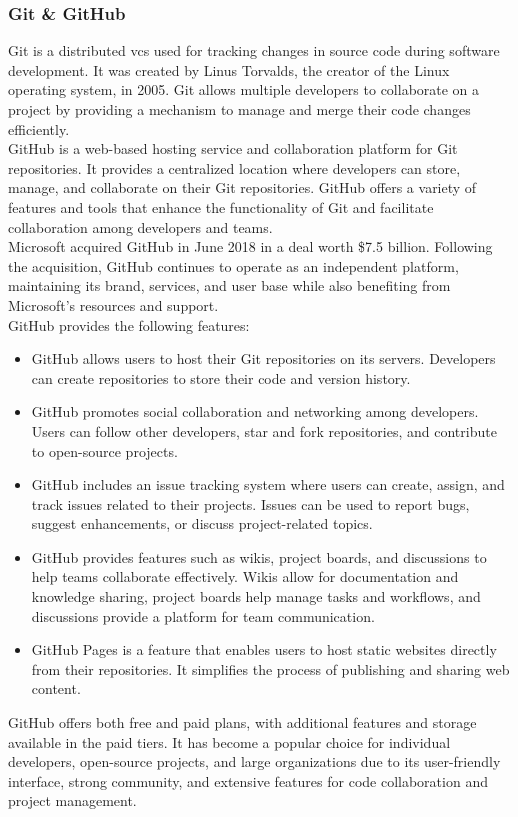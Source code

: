 \subsubsection{Git \& GitHub}
Git is a distributed \gls{vcs} used for tracking changes in source code during software development. It was created by Linus Torvalds, the creator of the Linux operating system, in 2005. Git allows multiple developers to collaborate on a project by providing a mechanism to manage and merge their code changes efficiently.\vspace{5mm} \\
GitHub is a web-based hosting service and collaboration platform for Git repositories. It provides a centralized location where developers can store, manage, and collaborate on their Git repositories. GitHub offers a variety of features and tools that enhance the functionality of Git and facilitate collaboration among developers and teams.\vspace{5mm} \\
Microsoft acquired GitHub in June 2018 in a deal worth \$7.5 billion. Following the acquisition, GitHub continues to operate as an independent platform, maintaining its brand, services, and user base while also benefiting from Microsoft's resources and support.\vspace{5mm} \\
GitHub provides the following features:
\begin{itemize}
  \item GitHub allows users to host their Git repositories on its servers. Developers can create repositories to store their code and version history.
  \item GitHub promotes social collaboration and networking among developers. Users can follow other developers, star and fork repositories, and contribute to open-source projects.
  \item GitHub includes an issue tracking system where users can create, assign, and track issues related to their projects. Issues can be used to report bugs, suggest enhancements, or discuss project-related topics.
  \item GitHub provides features such as wikis, project boards, and discussions to help teams collaborate effectively. Wikis allow for documentation and knowledge sharing, project boards help manage tasks and workflows, and discussions provide a platform for team communication.
  \item GitHub Pages is a feature that enables users to host static websites directly from their repositories. It simplifies the process of publishing and sharing web content.
\end{itemize}
GitHub offers both free and paid plans, with additional features and storage available in the paid tiers. It has become a popular choice for individual developers, open-source projects, and large organizations due to its user-friendly interface, strong community, and extensive features for code collaboration and project management.
